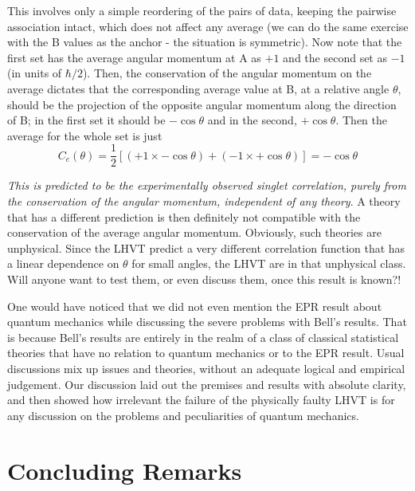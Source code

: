This involves only a simple reordering of the pairs of data, keeping the pairwise association intact, which does not affect any average (we can do the same exercise with the B values as the anchor - the situation is symmetric). Now note that the first set has the average angular
momentum at A as $+1$ and the second set as $-1$ (in units of $\hbar/2$). Then, the conservation
of the angular momentum on the average dictates that the corresponding average value at
B, at a relative angle $\theta$, should be the projection of the opposite angular momentum along
the direction of B; in the first set it should be $- \cos \theta$ and in the second, $+ \cos \theta$. Then the
average for the whole set is just
\begin{equation*}
C_e(\theta) = \frac{1}{2}\left[(+1 \times -\cos \theta) + (-1 \times + \cos \theta )\right]  = -\cos\theta \tag{42}\label{c14-eq42}
\end{equation*}

\textit{This is predicted to be the experimentally observed singlet correlation, purely from the
conservation of the angular momentum, independent of any theory}. A theory that has a
different prediction is then definitely not compatible with the conservation of the average
angular momentum. Obviously, such theories are unphysical. Since the LHVT predict a
very different correlation function that has a linear dependence on $\theta$ for small angles, the
LHVT are in that unphysical class. Will anyone want to test them, or even discuss them,
once this result is known?!

One would have noticed that we did not even mention the EPR result about quantum
mechanics while discussing the severe problems with Bell's results. That is because Bell's
results are entirely in the realm of a class of classical statistical theories that have no relation
to quantum mechanics or to the EPR result. Usual discussions mix up issues and theories,
without an adequate logical and empirical judgement. Our discussion laid out the premises
and results with absolute clarity, and then showed how irrelevant the failure of the physically
faulty LHVT is for any discussion on the problems and peculiarities of quantum mechanics.

\section{Concluding Remarks}\label{c14-sec10}

